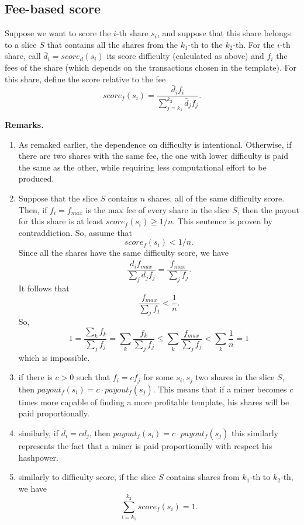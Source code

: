 \documentclass[11pt]{article} %
\begin{document}
\subsection{Fee-based score}
\begin{comment} We recall that a slice is denoted with $S_{a,\ell}$ with $\ell$ is the prevhash and $0 \le a \le n_\ell$, with $n_\ell$ is the number of slices for the group $B_\ell$ of all the shares that have the same prevhash $\ell$. We recall also that to each slice $S_{a,\ell}$ is assigned a portion of the block fees $F_{S_{a, \ell}}$.\newline
Now it is given a method for scoring the shares within a slice and redistributing $F_{S_{a, \ell}}$ accorindgly. Since we are working within a single slice, there is no need to keep track of the indexes. So, in order to keep the notation light, with abuse of notation we simply denote $S_{a, \ell}$ with and $F_{S_{a, \ell}}$ with $F_S$.
\end{comment}
Suppose we want to score the $i$-th share $s_i$, and suppose that this share belongs to a slice $S$ that contains all the shares from the $k_1$-th to the $k_2$-th.
For the $i$-th share, call $\bar d_i = score_d(s_i)$ its score difficulty (calculated as above) and $f_i$ the fees of the share (which depends on the transactions chosen in the template). For this share, define the score relative to the fee
\[
score_f(s_i) = \frac{\bar d_if_i}{\sum_{j=k_1}^{k_2}\bar d_j f_j}.
\]

\textbf{Remarks.} \begin{enumerate} 
\item As remaked earlier, the dependence on difficulty is intentional. Otherwise, if there are two shares with the same fee, the one with lower difficulty is paid the same as the other, while requiring less computational effort to be produced.
\item Suppose that the slice $S$ contains $n$ shares, all of the same difficulty score. Then, if $f_i = f_{max}$ is the max fee of every share in the slice $S$, then the payout for this share is at least $score_f(s_i) \ge 1/n$. This sentence is proven by contraddiction. So, assume that 
\[score_f(s_i) < 1/n.\]
Since all the shares have the same difficulty score, we have 
\[\frac{\bar d_if_{max}}{\sum_j d_j f_j} = \frac{f_{max}}{\sum_j f_j}.\]It follows that
\[ \frac{f_{max}}{\sum_j f_j} <\frac{1} {n}.\]
So,
\[ 1 = \frac{\sum_k f_k}{\sum_j f_j} = \sum_k \frac {f_k}{\sum_j f_j} \le \sum_k \frac{f_{max}}{\sum_j f_j}<\sum_k\frac{1}{n} = 1\]
which is impossible.
\item if there is $c>0$ such that $f_i = cf_j$ for some $s_i, s_j$ two shares in the slice $S$, then $payout_f(s_i) = c \cdot payout_f(s_j)$. This means that if a miner becomes $c$ times more capable of finding a more profitable template, his shares will be paid proportionally.
\item similarly, if $\bar d_i = c \bar d_j$, then $payout_f(s_i) = c \cdot payout_f(s_j)$ this similarly represents the fact that a miner is paid proportionally with respect his hashpower.
\item similarly to difficulty score, if the slice $S$ contains shares from $k_1$-th to $k_2$-th, we have \[\sum_{i=k_1}^{k_2} score_f(s_i) = 1. \]
\end{enumerate}
\end{document}
